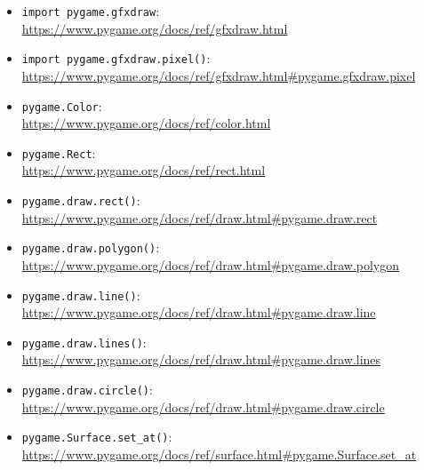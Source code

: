 \begin{itemize}
\item \texttt{import pygame.gfxdraw}:\\ \url{https://www.pygame.org/docs/ref/gfxdraw.html}

\item \texttt{import pygame.gfxdraw.pixel()}:\\ \url{https://www.pygame.org/docs/ref/gfxdraw.html#pygame.gfxdraw.pixel}

\item \texttt{pygame.Color}:
\\
\url{https://www.pygame.org/docs/ref/color.html}

\item \texttt{pygame.Rect}:
\\
\url{https://www.pygame.org/docs/ref/rect.html}

\item \texttt{pygame.draw.rect()}:
\\
\url{https://www.pygame.org/docs/ref/draw.html#pygame.draw.rect}

\item \texttt{pygame.draw.polygon()}:
\\
\url{https://www.pygame.org/docs/ref/draw.html#pygame.draw.polygon}

\item \texttt{pygame.draw.line()}:
\\
\url{https://www.pygame.org/docs/ref/draw.html#pygame.draw.line}

\item \texttt{pygame.draw.lines()}:
\\
\url{https://www.pygame.org/docs/ref/draw.html#pygame.draw.lines}

\item \texttt{pygame.draw.circle()}:
\\
\url{https://www.pygame.org/docs/ref/draw.html#pygame.draw.circle}

\item \texttt{pygame.Surface.set\_at()}:
\\
\url{https://www.pygame.org/docs/ref/surface.html#pygame.Surface.set_at}

\end{itemize}

